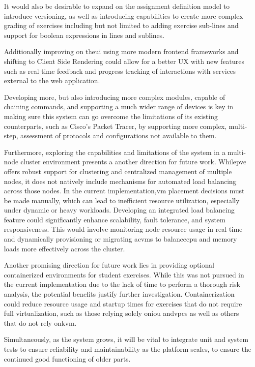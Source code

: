    It would also be desirable to expand on the assignment definition model to introduce versioning, as well as introducing 
    capabilities to create more complex grading of exercises including but not limited to adding exercise sub-lines and 
    support for boolean expressions in lines and sublines. 

    Additionally improving on the\ac{ui} using more modern frontend frameworks and shifting to Client Side Rendering could allow 
    for a better UX with new features such as real time feedback and progress tracking of interactions with services external 
    to the web application.

    Developing more, but also introducing more complex modules, capable of chaining commands, and supporting a much wider range 
    of devices is key in making sure this system can go overcome the limitations of its existing counterparts, such as Cisco's 
    Packet Tracer, by supporting more complex, multi-step, assessment of protocols and configurations not available to them.

    Furthermore, exploring the capabilities and limitations of the system in a multi-node cluster environment presents a 
    another direction for future work. While\ac{pve} offers robust support for clustering and centralized management of multiple 
    nodes, it does not natively include mechanisms for automated load balancing across those nodes. In the current implementation,\ac{vm} 
    placement decisions must be made manually, which can lead to inefficient resource utilization, especially under dynamic 
    or heavy workloads. Developing an integrated load balancing feature could significantly enhance scalability, fault tolerance, 
    and system responsiveness. This would involve monitoring node resource usage in real-time and dynamically provisioning or migrating 
    ac{vm}s to balance\ac{cpu} and memory loads more effectively across the cluster.

    Another promising direction for future work lies in providing optional containerized environments for student exercises. While 
    this was not pursued in the current implementation due to the lack of time to perform a thorough risk analysis, the potential 
    benefits justify further investigation. Containerization could reduce resource usage and startup times for exercises that do 
    not require full virtualization, such as those relying solely on\ac{iou} and\ac{vpcs} as well as others that do not rely on\ac{kvm}. 
    
    Simultaneously, as the system grows, it will be vital to integrate unit and system tests to ensure reliability and 
    maintainability as the platform scales, to ensure the continued good functioning of older parts.

